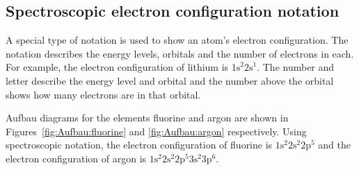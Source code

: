 \subsection*{Spectroscopic electron configuration notation}
        \label{m38741*id259749}A special type of notation is used to show an atom's electron configuration. The notation describes the energy levels, orbitals and the number of electrons in each. For example, the electron configuration of lithium is ${1\text{s}}^{2}{2\text{s}}^{1}$. The number and letter describe the energy level and orbital and the number above the orbital shows how many electrons are in that orbital. 

Aufbau diagrams for the elements fluorine and argon are shown in Figures~\ref{fig:Aufbau:fluorine} and \ref{fig:Aufbau:argon} respectively. Using spectroscopic notation, the electron configuration of fluorine is $1\text{s}^{2}{2}\text{s}^{2}2\text{p}^{5}$ and the electron configuration of argon is $1\text{s}^{2}{2}\text{s}^{2}2\text{p}^{5}{3}\text{s}^{2}3\text{p}^{6}$. \\

